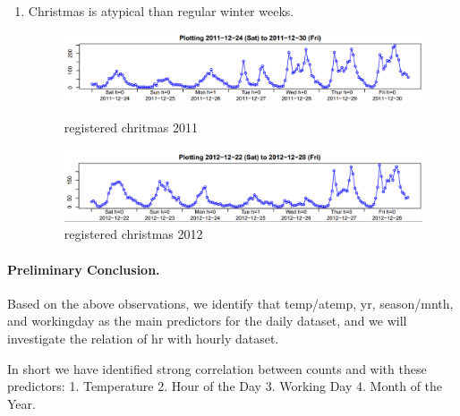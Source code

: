 \documentclass[12pt]{article}
\begin{document}
\begin{enumerate}
		\item Christmas is atypical than regular winter weeks.
			 \begin{figure}[H]
			 	\centering
			 	\begin{minipage}{.5\textwidth}
			 		\centering
			 		\includegraphics[width=\linewidth]{figures/registered_christmas_2011.png}
			 		\caption{registered chritmas 2011}
			 	\end{minipage}%
			 	\begin{minipage}{.5\textwidth}
			 		\centering
			 		\includegraphics[width=\linewidth]{figures/registered_christmas_2012.png}
			 		\caption{registered christmas 2012}
			 	\end{minipage}
			 \end{figure}
		\end{enumerate}
		
	\paragraph*{Preliminary Conclusion.}
	Based on the above observations, we identify that temp/atemp, yr, season/mnth, and workingday as the main predictors for the  daily dataset, and we will investigate the relation of hr with hourly dataset.
	
	In short we have identified strong correlation between counts and with these predictors: 1. Temperature 2. Hour of the Day 3. Working Day 4. Month of the Year. 
	
\end{document}

